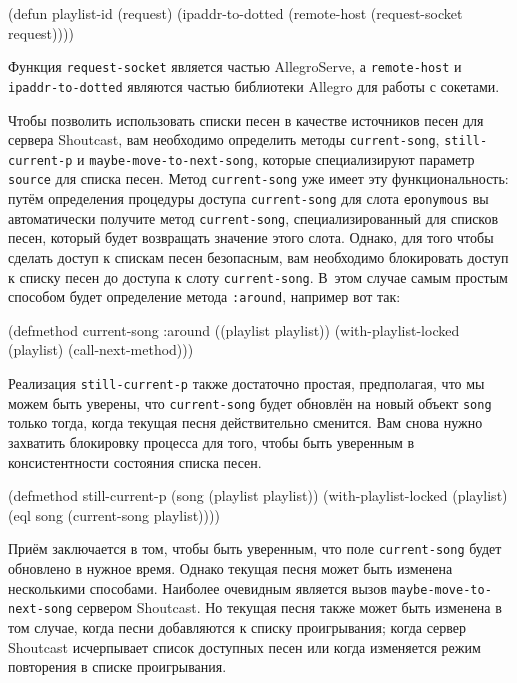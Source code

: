 \begin{myverb}
(defun playlist-id (request)
  (ipaddr-to-dotted (remote-host (request-socket request))))
\end{myverb}

Функция \lstinline{request-socket} является частью AllegroServe, а \lstinline{remote-host} и
\lstinline{ipaddr-to-dotted} являются частью библиотеки Allegro для работы с сокетами.

Чтобы позволить использовать списки песен в качестве источников песен для сервера
Shoutcast, вам необходимо определить методы \lstinline{current-song}, \lstinline{still-current-p} и
\lstinline{maybe-move-to-next-song}, которые специализируют параметр \lstinline{source} для списка
песен. Метод \lstinline{current-song} уже имеет эту функциональность: путём определения
процедуры доступа \lstinline{current-song} для слота \lstinline{eponymous} вы автоматически
получите метод \lstinline{current-song}, специализированный для списков песен, который будет
возвращать значение этого слота. Однако, для того чтобы сделать доступ к спискам песен
безопасным, вам необходимо блокировать доступ к списку песен до доступа к слоту
\lstinline{current-song}.  В~этом случае самым простым способом будет определение метода
\lstinline{:around}, например вот так:

\begin{myverb}
(defmethod current-song :around ((playlist playlist))
  (with-playlist-locked (playlist) (call-next-method)))
\end{myverb}

Реализация \lstinline{still-current-p} также достаточно простая, предполагая, что мы можем быть
уверены, что \lstinline{current-song} будет обновлён на новый объект \lstinline{song} только тогда,
ког\-да текущая песня действительно сменится.  Вам снова нужно захватить блокировку процесса
для того, чтобы быть уверенным в консистентности состояния списка песен.

\begin{myverb}
(defmethod still-current-p (song (playlist playlist))
  (with-playlist-locked (playlist)
    (eql song (current-song playlist))))
\end{myverb}

Приём заключается в том, чтобы быть уверенным, что поле \lstinline{current-song} будет
обновлено в нужное время.  Однако текущая песня может быть изменена несколькими
способами.  Наиболее очевидным является вызов \lstinline{maybe-move-to-next-song} сервером
Shoutcast.  Но текущая песня также может быть изменена в том случае, когда песни
добавляются к списку проигрывания; когда сервер Shoutcast исчерпывает список доступных
песен или когда изменяется режим повторения в списке проигрывания.

